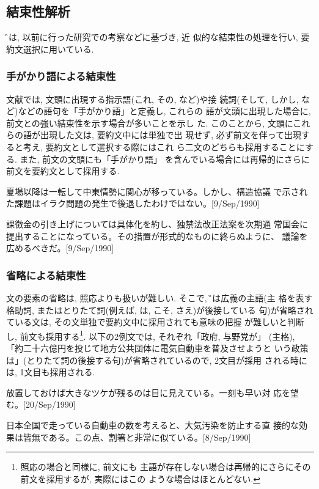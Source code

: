 \subsection{結束性解析}\label{結束性解析}
 \G では, 以前に行った研究\cite{手がかり語}での考察などに基づき, 近
似的な結束性の処理を行い, 要約文選択に用いている. 


\subsubsection{手がかり語による結束性}\label{anaphora}
文献\cite{手がかり語}では, 文頭に出現する指示語(これ, その, など)や接
続詞(そして, しかし, など)などの語句を「手がかり語」と定義し, これらの
語が文頭に出現した場合に, 前文との強い結束性を示す場合が多いことを示し
た. このことから, 文頭にこれらの語が出現した文は, 要約文中には単独で出
現せず, 必ず前文を伴って出現すると考え, 要約文として選択する際にはこれ
ら二文のどちらも採用することにする. また, 前文の文頭にも「手がかり語」
を含んでいる場合には再帰的にさらに前文を要約文として採用する. 

\begin{sample}
\item 夏場以降は一転して中東情勢に関心が移っている。しかし、構造協議
で示された課題はイラク問題の発生で後退したわけではない。[9/Sep/1990]
\item 課徴金の引き上げについては具体化を約し、独禁法改正法案を次期通
常国会に提出することになっている。その措置が形式的なものに終らぬように、
議論を広めるべきだ。[9/Sep/1990]
\end{sample}

\subsubsection{省略による結束性}
文の要素の省略は, 照応よりも扱いが難しい. そこで, \G では広義の主語(主
格を表す格助詞, またはとりたて詞(例えば, は, こそ, さえ)が後接している
句)が省略されている文は, その文単独で要約文中に採用されても意味の把握
が難しいと判断し, 前文も採用する\footnote{照応の場合と同様に, 前文にも
主語が存在しない場合は再帰的にさらにその前文を採用するが, 実際にはこの
ような場合はほとんどない. }. 以下の2例文では, それぞれ「政府, 与野党が」
(主格), 「約二十六億円を投じて地方公共団体に電気自動車を普及させようと
いう政策は」(とりたて詞の後接する句)が省略されているので, 2文目が採用
される時には, 1文目も採用される. 

\begin{sample}
\item 放置しておけば大きなツケが残るのは目に見えている。一刻も早い対
応を望む。[20/Sep/1990]
\item 日本全国で走っている自動車の数を考えると、大気汚染を防止する直
接的な効果は皆無である。この点、割箸と非常に似ている。[8/Sep/1990]
\end{sample}

